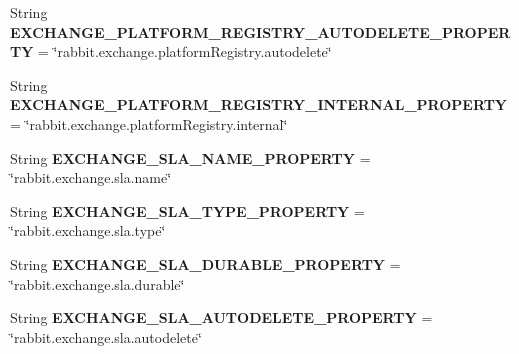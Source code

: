 \begin{DoxyCompactItemize}
\item 
\mbox{\label{interfaceeu_1_1h2020_1_1symbiote_1_1util_1_1RabbitConstants_a67160ff2bf7d972e2f68dee763a806ba}} 
String {\bfseries E\+X\+C\+H\+A\+N\+G\+E\+\_\+\+P\+L\+A\+T\+F\+O\+R\+M\+\_\+\+R\+E\+G\+I\+S\+T\+R\+Y\+\_\+\+A\+U\+T\+O\+D\+E\+L\+E\+T\+E\+\_\+\+P\+R\+O\+P\+E\+R\+TY} = \char`\"{}rabbit.\+exchange.\+platform\+Registry.\+autodelete\char`\"{}
\item 
\mbox{\label{interfaceeu_1_1h2020_1_1symbiote_1_1util_1_1RabbitConstants_a9a4b10a66d4defd9ebee4fb9e2d053f7}} 
String {\bfseries E\+X\+C\+H\+A\+N\+G\+E\+\_\+\+P\+L\+A\+T\+F\+O\+R\+M\+\_\+\+R\+E\+G\+I\+S\+T\+R\+Y\+\_\+\+I\+N\+T\+E\+R\+N\+A\+L\+\_\+\+P\+R\+O\+P\+E\+R\+TY} = \char`\"{}rabbit.\+exchange.\+platform\+Registry.\+internal\char`\"{}
\item 
\mbox{\label{interfaceeu_1_1h2020_1_1symbiote_1_1util_1_1RabbitConstants_a6c2b9791f9f372ec8d6f13d261134db4}} 
String {\bfseries E\+X\+C\+H\+A\+N\+G\+E\+\_\+\+S\+L\+A\+\_\+\+N\+A\+M\+E\+\_\+\+P\+R\+O\+P\+E\+R\+TY} = \char`\"{}rabbit.\+exchange.\+sla.\+name\char`\"{}
\item 
\mbox{\label{interfaceeu_1_1h2020_1_1symbiote_1_1util_1_1RabbitConstants_adaabf0c1e4a3327ce8ffc72ee58d4b03}} 
String {\bfseries E\+X\+C\+H\+A\+N\+G\+E\+\_\+\+S\+L\+A\+\_\+\+T\+Y\+P\+E\+\_\+\+P\+R\+O\+P\+E\+R\+TY} = \char`\"{}rabbit.\+exchange.\+sla.\+type\char`\"{}
\item 
\mbox{\label{interfaceeu_1_1h2020_1_1symbiote_1_1util_1_1RabbitConstants_ac3ef5b0045fca7948d60b7940e14b702}} 
String {\bfseries E\+X\+C\+H\+A\+N\+G\+E\+\_\+\+S\+L\+A\+\_\+\+D\+U\+R\+A\+B\+L\+E\+\_\+\+P\+R\+O\+P\+E\+R\+TY} = \char`\"{}rabbit.\+exchange.\+sla.\+durable\char`\"{}
\item 
\mbox{\label{interfaceeu_1_1h2020_1_1symbiote_1_1util_1_1RabbitConstants_a87e78b363549c57f244fe0622e61e44d}} 
String {\bfseries E\+X\+C\+H\+A\+N\+G\+E\+\_\+\+S\+L\+A\+\_\+\+A\+U\+T\+O\+D\+E\+L\+E\+T\+E\+\_\+\+P\+R\+O\+P\+E\+R\+TY} = \char`\"{}rabbit.\+exchange.\+sla.\+autodelete\char`\"{}

\end{DoxyCompactItemize}
